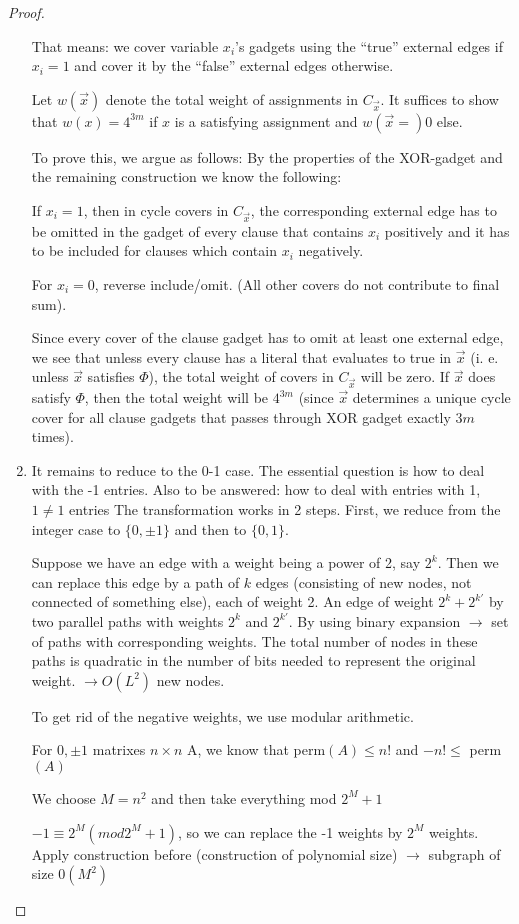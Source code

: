 \documentclass[11pt]{article}
\theoremstyle{definition}
\theoremstyle{definition}
\begin{document}
\begin{proof}
\begin{enumerate}
That means: we cover variable $ x_i $'s gadgets using the ``true'' external edges if $ x_i = 1 $ and cover it by the ``false'' external edges otherwise.

Let $ w(\overrightarrow x) $ denote the total weight of assignments in $ C_{\overrightarrow x} $. It suffices to show that $ w(x) = 4^{3m} $ if $ x $ is a satisfying assignment and $ w (\overrightarrow x = ) 0 $ else.

To prove this, we argue as follows: By the properties of the XOR-gadget and the remaining construction we know the following:

If $ x_i = 1 $, then in cycle covers in $ C_{\overrightarrow x} $, the corresponding external edge has to be omitted in the gadget of every clause that contains $ x_i $ positively and it has to be included for clauses which contain $ x_i $ negatively.

For $ x_i = 0$, reverse include/omit. (All other covers do not contribute to final sum).

Since every cover of the clause gadget has to omit at least one external edge, we see that unless every clause has a literal that evaluates to true in $ \overrightarrow x $ (i. e. unless $ \overrightarrow x $ satisfies $ \Phi $), the total weight of covers in $ C_{\overrightarrow x} $ will be zero. If $ \overrightarrow x $ does satisfy $ \Phi $, then the total weight will be $ 4^{3m} $ (since $ \overrightarrow x $ determines a unique cycle cover for all clause gadgets that passes through XOR gadget exactly $ 3 m $ times).


\item It remains to reduce to the 0-1 case. The essential question is how to deal with the -1 entries. Also to be answered: how to deal with entries with 1, $ 1 \neq 1 $ entries %
The transformation works in 2 steps. First, we reduce from the integer case to $ \{0,\pm 1\} $ and then to $ \{0,1\} $.

Suppose we have an edge with a weight being a power of 2, say $ 2^k $. Then we can replace this edge by a path of $ k $ edges (consisting of new nodes, not connected of something else), each of weight 2. An edge of weight $ 2^k + 2^{k'} $ by two parallel paths with weights $ 2^k $ and $ 2^{k'} $. By using binary expansion %
$ \rightarrow $ set of paths with corresponding weights. The total number of nodes in these paths is quadratic in the number of bits needed to represent the original weight. $ \rightarrow O(L^2) $ new nodes.

To get rid of the negative weights, we use modular arithmetic.

For $ 0, \pm 1 $ matrixes $ n \times n $ A, we know that perm$(A) \leq n!$ and $ -n! \leq $ perm$(A)$

We choose $ M = n^2 $ and then take everything mod $2^M + 1 $

$ -1 \equiv 2^M (mod 2^M + 1) $, so we can replace the -1 weights by $ 2^M $ weights. %
Apply construction before (construction of polynomial size) $ \rightarrow $ subgraph of size $ 0(M^2) $


\end{enumerate}
\end{proof}
\end{document}
